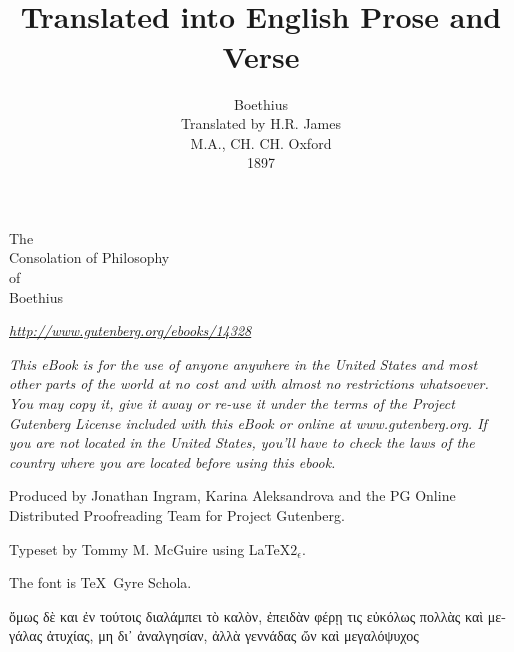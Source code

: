 \documentclass[11pt]{book}
\title{\simpletitle \\[1em] {\small Translated into English Prose and Verse}}
\author{Boethius \\[2em] Translated by H.R. James \\ {\small M.A., CH. CH. Oxford} \\[2em] 1897}
\date{}
\newcommand{\simpletitle}{The \\ Consolation of Philosophy \\ of \\ Boethius}
\begin{document}
\setlength{\baselineskip}{1.2\baselineskip}

\frontmatter

\thispagestyle{empty}
\hspace{0pt}
\newpage

\thispagestyle{empty}
\hspace{0pt}
\newpage

\thispagestyle{empty}
\hspace{0pt}
\vfill
\begin{center}
  \Large
  \simpletitle
\end{center}
\vfill

\pagebreak
\thispagestyle{empty}

\hspace{0pt}
\vfill

\emph{\href{http://www.gutenberg.org/ebooks/14328}{http://www.gutenberg.org/ebooks/14328}}

\emph{This eBook is for the use of anyone anywhere in the United States and
most other parts of the world at no cost and with almost no
restrictions whatsoever. You may copy it, give it away or re-use it
under the terms of the Project Gutenberg License included with this
eBook or online at www.gutenberg.org. If you are not located in the
United States, you'll have to check the laws of the country where you
are located before using this ebook.}

\pagebreak

\thispagestyle{empty}
\hspace{0pt}
\vfill

\noindent Produced by Jonathan Ingram, Karina Aleksandrova and the PG Online Distributed Proofreading Team for Project Gutenberg.

\noindent Typeset by Tommy M. McGuire using \LaTeX $2_\epsilon$.

\noindent The font is \TeX\ Gyre Schola.

\pagebreak

\thispagestyle{empty}
\hspace{0pt}
\vfill

\noindent
\begin{greek}
ὄμως δὲ και ἐν τούτοις διαλάμπει τὸ καλὸν,
ἐπειδὰν φέρῃ τις εὐκόλως πολλὰς καὶ μεγάλας
ἀτυχίας, μη δι᾿ ἀναλγησίαν, ἀλλὰ γεννάδας
ὤν καὶ μεγαλόψυχος
\end{greek}

\vspace{2em}

\end{document}
